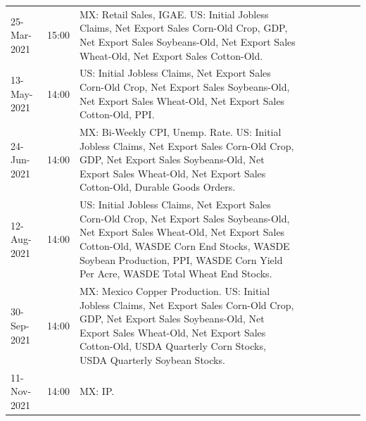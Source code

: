 \documentclass[a4paper,12pt]{article} 		%
\begin{document}
\begin{tiny}
\begin{center}
\begin{longtable}{p{1.8cm}p{1cm}p{11.7cm}p{1.8cm}p{1cm}p{11.7cm}p{1.8cm}p{1cm}p{11.7cm}}
			25-Mar-2021 & 15:00 & MX: Retail Sales, IGAE. US: Initial Jobless Claims, Net Export Sales Corn-Old Crop, GDP, Net Export Sales Soybeans-Old, Net Export Sales Wheat-Old, Net Export Sales Cotton-Old. \\
			13-May-2021 & 14:00 & US: Initial Jobless Claims, Net Export Sales Corn-Old Crop, Net Export Sales Soybeans-Old, Net Export Sales Wheat-Old, Net Export Sales Cotton-Old, PPI. \\
			24-Jun-2021 & 14:00 & MX: Bi-Weekly CPI, Unemp. Rate. US: Initial Jobless Claims, Net Export Sales Corn-Old Crop, GDP, Net Export Sales Soybeans-Old, Net Export Sales Wheat-Old, Net Export Sales Cotton-Old, Durable Goods Orders. \\
			12-Aug-2021 & 14:00 & US: Initial Jobless Claims, Net Export Sales Corn-Old Crop, Net Export Sales Soybeans-Old, Net Export Sales Wheat-Old, Net Export Sales Cotton-Old, WASDE Corn End Stocks, WASDE Soybean Production, PPI, WASDE Corn Yield Per Acre, WASDE Total Wheat End Stocks. \\
			30-Sep-2021 & 14:00 & MX: Mexico Copper Production. US: Initial Jobless Claims, Net Export Sales Corn-Old Crop, GDP, Net Export Sales Soybeans-Old, Net Export Sales Wheat-Old, Net Export Sales Cotton-Old, USDA Quarterly Corn Stocks, USDA Quarterly Soybean Stocks. \\
			11-Nov-2021 & 14:00 & MX: IP. \\
			\bottomrule
		\end{longtable}
	\end{center}
\end{tiny}
\end{document}
